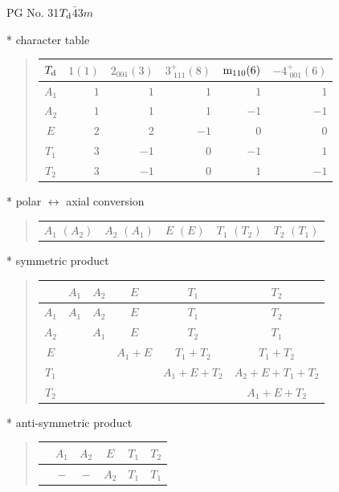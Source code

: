 \documentclass[fleqn,8pt,landscape]{jsarticle}
\begin{document}
\setcounter{MaxMatrixCols}{32}

\renewcommand{\tablename}{Table~}
\renewcommand{\figurename}{Figure~}
\begin{center}
\LARGE
PG No. 31\quad$T_{\rm d}$\quad$\bar{4}3m$\quad[ cubic ]
\end{center}

* character table
\begin{quote}
\begin{tabular}{crrrrr} \hline \hline
$ T_{\rm d} $ & $ 1(1) $ & $ 2{}_{001}(3) $ & $ 3^{+}_{\,\,111}(8) $ & $ {\rm m}_{110}(6) $ & $ -4^{+}_{\,\,001}(6) $ \\ \hline
$ A_{1} $ & $ 1 $ & $ 1 $ & $ 1 $ & $ 1 $ & $ 1 $ \\
$ A_{2} $ & $ 1 $ & $ 1 $ & $ 1 $ & $ -1 $ & $ -1 $ \\
$ E $ & $ 2 $ & $ 2 $ & $ -1 $ & $ 0 $ & $ 0 $ \\
$ T_{1} $ & $ 3 $ & $ -1 $ & $ 0 $ & $ -1 $ & $ 1 $ \\
$ T_{2} $ & $ 3 $ & $ -1 $ & $ 0 $ & $ 1 $ & $ -1 $ \\
 \hline \hline
\end{tabular}
\end{quote}

* polar $\leftrightarrow$ axial conversion
\begin{quote}
\begin{tabular}{ccccc}
$ A_{1}\,\,(A_{2}) $ & $ A_{2}\,\,(A_{1}) $ & $ E\,\,(E) $ & $ T_{1}\,\,(T_{2}) $ & $ T_{2}\,\,(T_{1}) $
\end{tabular}
\end{quote}

* symmetric product
\begin{quote}
\begin{tabular}{c|ccccc} \hline \hline
 & $ A_{1} $ & $ A_{2} $ & $ E $ & $ T_{1} $ & $ T_{2} $ \\ \hline
$ A_{1} $ & $ A_{1} $ & $ A_{2} $ & $ E $ & $ T_{1} $ & $ T_{2} $ \\
$ A_{2} $ & $  $ & $ A_{1} $ & $ E $ & $ T_{2} $ & $ T_{1} $ \\
$ E $ & $  $ & $  $ & $ A_{1} + E $ & $ T_{1} + T_{2} $ & $ T_{1} + T_{2} $ \\
$ T_{1} $ & $  $ & $  $ & $  $ & $ A_{1} + E + T_{2} $ & $ A_{2} + E + T_{1} + T_{2} $ \\
$ T_{2} $ & $  $ & $  $ & $  $ & $  $ & $ A_{1} + E + T_{2} $ \\
 \hline \hline
\end{tabular}
\end{quote}

* anti-symmetric product
\begin{quote}
\begin{tabular}{cccccc} \hline \hline
 & $ A_{1} $ & $ A_{2} $ & $ E $ & $ T_{1} $ & $ T_{2} $ \\ \hline
$  $ & $ - $ & $ - $ & $ A_{2} $ & $ T_{1} $ & $ T_{1} $ \\
 \hline \hline
\end{tabular}
\end{quote}
\end{document}
